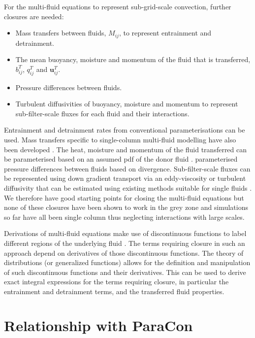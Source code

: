 \documentclass[11pt,a4paper]{article}
\begin{document}
For the multi-fluid equations to represent sub-grid-scale convection, further closures are needed:
\begin{itemize}
\item Mass transfers between fluids, $M_{ij}$, to represent entrainment and detrainment.
\item The mean buoyancy, moisture and momentum of the fluid that is transferred, $b_{ij}^T$, $q_{ij}^T$ and $\mathbf{u}_{ij}^T$. 
\item Pressure differences between fluids.
\item Turbulent diffusivities of buoyancy, moisture and momentum to represent sub-filter-scale fluxes for each fluid and their interactions. 
\end{itemize}
Entrainment and detrainment rates from conventional parameterisations can be used. Mass transfers specific to single-column multi-fluid modelling have also been developed \cite[]{WMS20,TEB19}. The heat, moisture and momentum of the fluid transferred can be parameterised based on an assumed pdf of the donor fluid \cite[see][and the description in section \ref{sec:tools}]{McIn20}. \cite{WMS20} parameterised pressure differences between fluids based on divergence. Sub-filter-scale fluxes can be represented using down gradient transport via an eddy-viscosity or turbulent diffusivity that can be estimated using existing methods suitable for single fluids \cite[eg.][]{mellor1982}. We therefore have good starting points for closing the multi-fluid equations but none of these closures have been shown to work in the grey zone and simulations so far have all been single column thus neglecting interactions with large scales. 

Derivations of multi-fluid equations make use of discontinuous functions to label different regions of the underlying fluid \cite[]{Dopa77,TWV+18}. The terms requiring closure in such an approach depend on derivatives of those discontinuous functions. The theory of distributions (or generalized functions) \cite[]{Schw08} allows for the definition and manipulation of such discontinuous functions and their derivatives. This can be used to derive exact integral expressions for the terms requiring closure, in particular the entrainment and detrainment terms, and the transferred fluid properties.

\section{Relationship with ParaCon}
\end{document}
